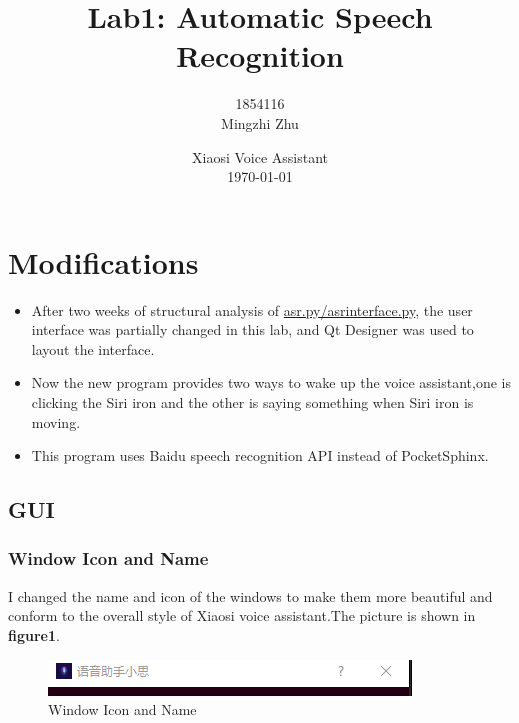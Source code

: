 \documentclass{hci}
\title{Lab1: Automatic Speech Recognition}
\author{1854116 \\Mingzhi Zhu}
\date{Xiaosi Voice Assistant\\\today}
\begin{document}
\maketitle
\tableofcontents
\newpage
\section{Modifications}

\begin{itemize}
	\item After two weeks of structural analysis of \underline{asr.py/asrinterface.py}, the user interface was partially changed in this lab, and Qt Designer was used to layout the interface.
	\item Now the new program provides two ways to wake up the voice assistant,one is clicking the Siri iron and the other is saying something when Siri iron is moving.
	\item This program uses Baidu speech recognition API instead of PocketSphinx.
\end{itemize}
\subsection{GUI}
\subsubsection{Window Icon and Name}
I changed the name and icon of the windows to make them more beautiful and conform to the overall style of Xiaosi voice assistant.The picture is shown in \textbf{figure1}.
 
\begin{figure}[htb]
	\centering
	\includegraphics[width=0.7\linewidth]{../picture/1}
	\caption{Window Icon and Name}
	\label{figure1}
\end{figure}
\end{document}
